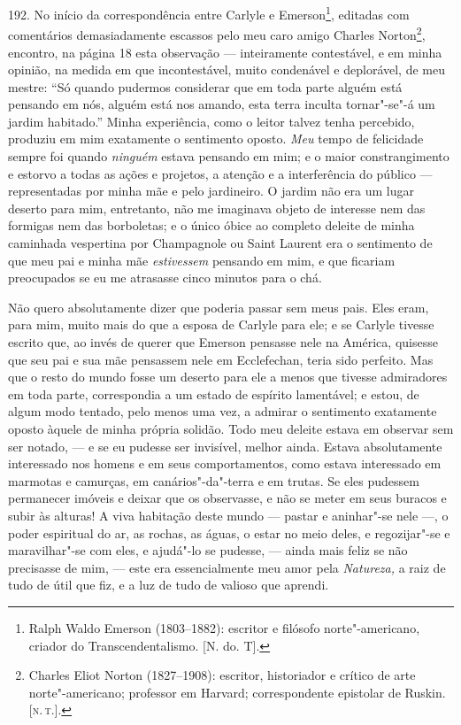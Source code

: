 192. No início da correspondência entre Carlyle e Emerson\footnote{Ralph
  Waldo Emerson (1803--1882): escritor e filósofo norte"-americano,
  criador do Transcendentalismo. {[}N. do. T{]}.}, editadas com
comentários demasiadamente escassos pelo meu caro amigo Charles
Norton\footnote{Charles Eliot Norton (1827--1908): escritor, historiador
  e crítico de arte norte"-americano; professor em Harvard;
  correspondente epistolar de Ruskin. {[}\textsc{n.\,t.}{]}.}, encontro, na
página 18 esta observação --- inteiramente contestável, e em minha
opinião, na medida em que incontestável, muito condenável e deplorável,
de meu mestre: ``Só quando pudermos considerar que em toda parte alguém
está pensando em nós, alguém está nos amando, esta terra inculta
tornar"-se"-á um jardim habitado.'' Minha experiência, como o leitor
talvez tenha percebido, produziu em mim exatamente o sentimento oposto.
\emph{Meu} tempo de felicidade sempre foi quando \emph{ninguém} estava
pensando em mim; e o maior constrangimento e estorvo a todas as ações e
projetos, a atenção e a interferência do público --- representadas por
minha mãe e pelo jardineiro. O jardim não era um lugar deserto para mim,
entretanto, não me imaginava objeto de interesse nem das formigas nem
das borboletas; e o único óbice ao completo deleite de minha caminhada
vespertina por Champagnole ou Saint Laurent era o sentimento de que meu
pai e minha mãe \emph{estivessem} pensando em mim, e que ficariam
preocupados se eu me atrasasse cinco minutos para o chá.

Não quero absolutamente dizer que poderia passar sem meus pais. Eles
eram, para mim, muito mais do que a esposa de Carlyle para ele; e se
Carlyle tivesse escrito que, ao invés de querer que Emerson pensasse
nele na América, quisesse que seu pai e sua mãe pensassem nele em
Ecclefechan, teria sido perfeito. Mas que o resto do mundo fosse um
deserto para ele a menos que tivesse admiradores em toda parte,
correspondia a um estado de espírito lamentável; e estou, de algum modo
tentado, pelo menos uma vez, a admirar o sentimento exatamente oposto
àquele de minha própria solidão. Todo meu deleite estava em observar sem
ser notado, --- e se eu pudesse ser invisível, melhor ainda. Estava
absolutamente interessado nos homens e em seus comportamentos, como
estava interessado em marmotas e camurças, em canários"-da"-terra e em
trutas. Se eles pudessem permanecer imóveis e deixar que os observasse,
e não se meter em seus buracos e subir às alturas! A viva habitação
deste mundo --- pastar e aninhar"-se nele ---, o poder espiritual do ar, as
rochas, as águas, o estar no meio deles, e regozijar"-se e maravilhar"-se
com eles, e ajudá"-lo se pudesse, --- ainda mais feliz se não precisasse
de mim, --- este era essencialmente meu amor pela \emph{Natureza,} a raiz
de tudo de útil que fiz, e a luz de tudo de valioso que aprendi.

